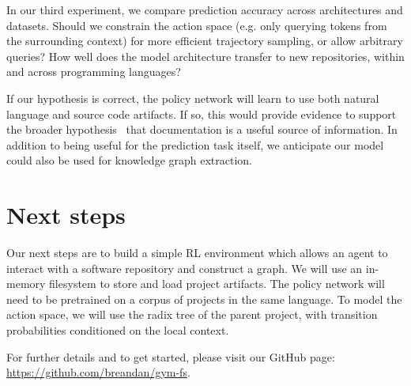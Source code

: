 \documentclass[11pt]{article}
\begin{document}
In our third experiment, we compare prediction accuracy across architectures and datasets. Should we constrain the action space (e.g. only querying tokens from the surrounding context) for more efficient trajectory sampling, or allow arbitrary queries? How well does the model architecture transfer to new repositories, within and across programming languages?

If our hypothesis is correct, the policy network will learn to use both natural language and source code artifacts. If so, this would provide evidence to support the broader hypothesis~\cite{guo2017semantically} that documentation is a useful source of information. In addition to being useful for the prediction task itself, we anticipate our model could also be used for knowledge graph extraction.

\section{Next steps}

Our next steps are to build a simple RL environment which allows an agent to interact with a software repository and construct a graph. We will use an in-memory filesystem to store and load project artifacts. The policy network will need to be pretrained on a corpus of projects in the same language. To model the action space, we will use the radix tree of the parent project, with transition probabilities conditioned on the local context.

For further details and to get started, please visit our GitHub page: \url{https://github.com/breandan/gym-fs}.

  
  
\end{document}
